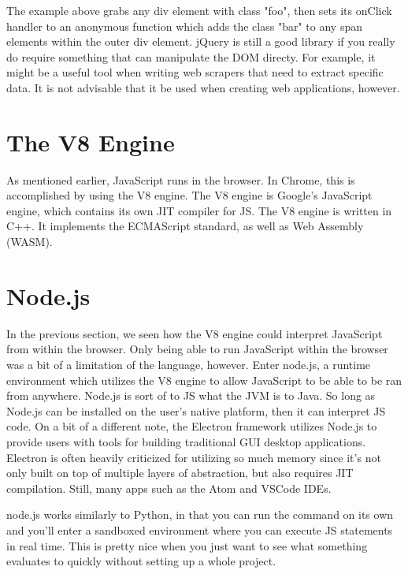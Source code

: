 \documentclass{article}
\begin{document}

The example above grabs any div element with class "foo", then sets its onClick handler to an anonymous
function which adds the class "bar" to any span elements within the outer div element. jQuery is still a good
library if you really do require something that can manipulate the DOM directy. For example, it might be a
useful tool when writing web scrapers that need to extract specific data. It is not advisable that it be used
when creating web applications, however.

\section{The V8 Engine}

As mentioned earlier, JavaScript runs in the browser. In Chrome, this is accomplished by using the V8 engine.
The V8 engine is Google's JavaScript engine, which contains its own JIT compiler for JS. The V8 engine is
written in C++. It implements the ECMAScript standard, as well as Web Assembly (WASM).

\section{Node.js}

In the previous section, we seen how the V8 engine could interpret JavaScript from within the browser. Only
being able to run JavaScript within the browser was a bit of a limitation of the language, however. Enter
node.js, a runtime environment which utilizes the V8 engine to allow JavaScript to be able to be ran from
anywhere. Node.js is sort of to JS what the JVM is to Java. So long as Node.js can be installed on the user's
native platform, then it can interpret JS code. On a bit of a different note, the Electron framework utilizes
Node.js to provide users with tools for building traditional GUI desktop applications. Electron is often
heavily criticized for utilizing so much memory since it's not only built on top of multiple layers of
abstraction, but also requires JIT compilation. Still, many apps such as the Atom and VSCode IDEs.

node.js works similarly to Python, in that you can run the command on its own and you'll enter a sandboxed
environment where you can execute JS statements in real time. This is pretty nice when you just want to see
what something evaluates to quickly without setting up a whole project.
\end{document}
